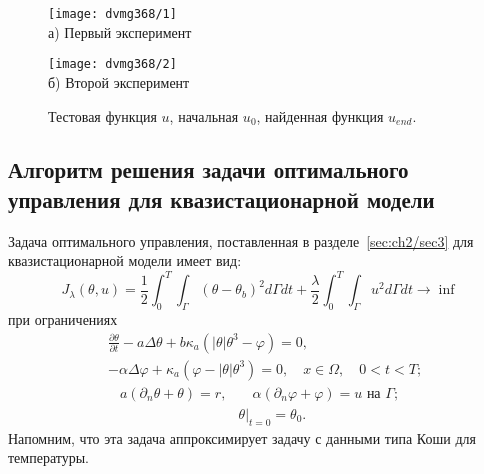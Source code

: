 \begin{figure}[h!t]
    \begin{minipage}[b][][b]{0.49\linewidth}
        \centering
        \texttt{[image: dvmg368/1]} \\ а) Первый эксперимент
    \end{minipage}
    \hfill
    \begin{minipage}[b][][b]{0.49\linewidth}
        \centering
        \texttt{[image: dvmg368/2]} \\ б) Второй эксперимент
    \end{minipage}
    \caption{Тестовая функция $u$, начальная $u_0$, найденная функция $u_{end}$.}
    \label{fig:4_3:control}
\end{figure}

\subsection{Алгоритм решения задачи оптимального управления для квазистационарной модели}
\label{subsec:ch4/sec3/quasistationary}
Задача оптимального управления, поставленная в разделе~\ref{sec:ch2/sec3}
для квазистационарной модели имеет вид:
\begin{equation*}
    J_{\lambda}(\theta, u)=\frac{1}{2} \int_{0}^{T}
    \int_{\Gamma}\left(\theta-\theta_{b}\right)^{2} d \Gamma d t+\frac{\lambda}{2}
    \int_{0}^{T} \int_{\Gamma} u^{2} d \Gamma d t \rightarrow \inf
\end{equation*}
при ограничениях
\begin{equation}
    \label{eq:4_3:1}
    \begin{split}
        & \frac{\partial \theta}{\partial t} - a \Delta \theta
        + b \kappa_{a} \left(|\theta| \theta^{3}-\varphi\right) = 0,\\
        & - \alpha \Delta \varphi
        + \kappa_{a} \left(\varphi-|\theta| \theta^{3}\right) = 0,
        \quad x \in \Omega, \quad 0 < t < T;
    \end{split}
\end{equation}
\begin{align}
    a \left(\partial_{n} \theta+\theta\right)=r,
    & \quad \alpha\left(\partial_{n} \varphi
    + \varphi\right) = u \text { на } \Gamma;  \label{eq:4_3:2}\\
    & \left.\theta\right|_{t=0} = \theta_{0}. \label{eq:4_3:3}
\end{align}
Напомним, что эта задача аппроксимирует задачу с данными типа Коши для температуры.


